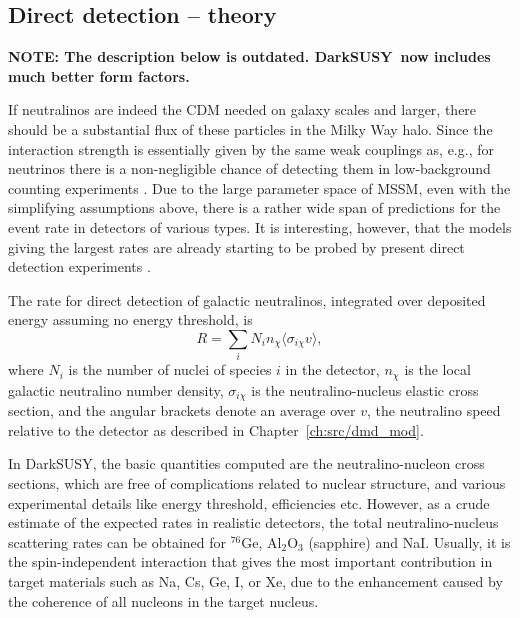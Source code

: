 \documentclass[a4paper,10pt,oneside]{book}
\newcommand{\ds}{{\sffamily DarkSUSY}}
\begin{document}
\subsection{Direct detection -- theory}

{\bfseries NOTE: The description below is outdated. \ds\ now includes
much better form factors.}

If  neutralinos are indeed the CDM needed on galaxy scales and larger,
there should be a substantial flux of these particles in the Milky
Way halo. Since the interaction strength  is
essentially given by the same weak couplings as, e.g., for neutrinos
there is a non-negligible chance of detecting them in low-background
counting experiments \cite{Goodman:1984dc}.
Due to the large parameter space of MSSM, even
with the simplifying assumptions above, there is a rather wide span of
predictions for the event rate in detectors of various types. It is
interesting, however, that the models giving the largest rates are
already starting to be probed by present direct detection
experiments \cite{Bergstrom:1995cz,Bottino:1996eu}.


The rate for direct detection of galactic neutralinos, integrated over
deposited energy assuming no energy threshold, is
\begin{equation}
   R = \sum_i N_i n_\chi \langle \sigma_{i\chi} v \rangle ,
\end{equation}
where $ N_i $ is the number of nuclei of species $i$ in the detector,
$n_\chi$ is the local galactic neutralino number density, $
\sigma_{i\chi} $ is the neutralino-nucleus elastic cross section, and
the angular brackets denote an average over $ v $, the neutralino
speed relative to the detector as described in Chapter~\ref{ch:src/dmd_mod}.

In \ds, the basic quantities computed are the neutralino-nucleon cross
sections, which are free of complications related to nuclear
structure, and various experimental details like energy threshold,
efficiencies etc.  However, as a crude estimate of the expected rates
in realistic detectors, the total neutralino-nucleus scattering rates
can be obtained for $^{76}$Ge, Al$_2$O$_3$ (sapphire) and NaI.
Usually, it is the spin-independent interaction that gives the most
important contribution in target materials such as Na, Cs, Ge, I, or
Xe, due to the enhancement caused by the coherence of all nucleons in
the target nucleus.
\end{document}
